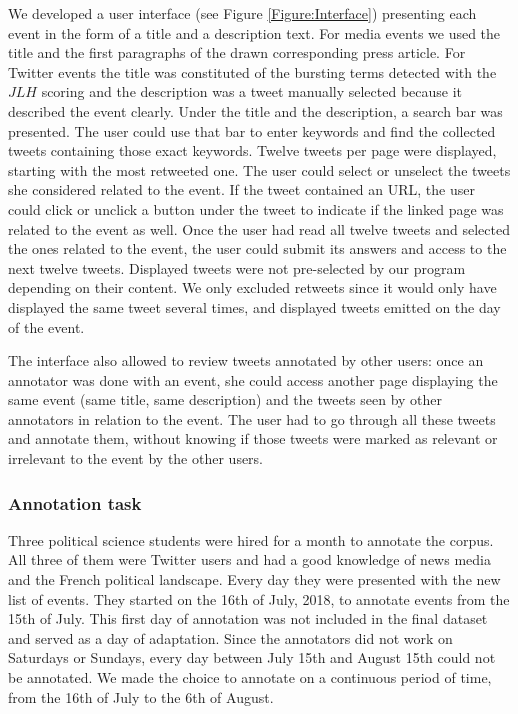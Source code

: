 We developed a user interface (see Figure \ref{Figure:Interface}) presenting each event in the form of a title and a description text. For media events we used the title and the first paragraphs of the drawn corresponding press article. For Twitter events the title was constituted of the bursting terms detected with the $JLH$ scoring and the description was a tweet manually selected because it described the event clearly. Under the title and the description, a search bar was presented. The user could use that bar to enter keywords and find the collected tweets containing those exact keywords. Twelve tweets per page were displayed, starting with the most retweeted one. The user could select or unselect the tweets she considered related to the event. If the tweet contained an URL, the user could click or unclick a button under the tweet to indicate if the linked page was related to the event as well. Once the user had read all twelve tweets and selected the ones related to the event, the user could submit its answers and access to the next twelve tweets. Displayed tweets were not pre-selected by our program depending on their content. We only excluded retweets since it would only have displayed the same tweet several times, and displayed tweets emitted on the day of the event. 


The interface also allowed to review tweets annotated by other users: once an annotator was done with an event, she could access another page displaying the same event (same title, same description) and the tweets seen by other annotators in relation to the event. The user had to go through all these tweets and annotate them, without knowing if those tweets were marked as relevant or irrelevant to the event by the other users.

		\subsubsection{Annotation task}
	Three political science students were hired for a month to annotate the corpus. All three of them were Twitter users and had a good knowledge of news media and the French political landscape. Every day they were presented with the new list of events. They started on the 16th of July, 2018, to annotate events from the 15th of July. This first day of annotation was not included in the final dataset and served as a day of adaptation. Since the annotators did not work on Saturdays or Sundays, every day between July 15th and August 15th could not be annotated. We made the choice to annotate on a continuous period of time, from the 16th of July to the 6th of August.


